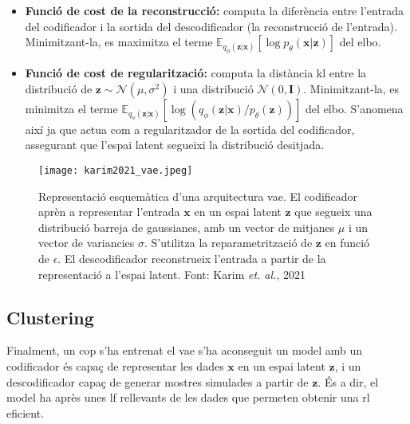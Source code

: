 \documentclass[CAT,BIB]{TFUOC}%
\begin{document}
        \begin{itemize}
            \item \textbf{Funció de cost de la reconstrucció:}
            computa la diferència entre l'entrada del codificador
            i la sortida del descodificador
            (la reconstrucció de l'entrada).
            Minimitzant-la, es maximitza el terme
            $\mathbb{E}_{q_\phi(\mathbf{z|x})} [ \log p_\theta(\mathbf{x|z}) ]$
            del \gls{elbo}.

            \item \textbf{Funció de cost de regularització:}
            computa la distància \gls{kl}
            entre la distribució de $\mathbf{z} \sim \mathcal{N}(\mu, \sigma^2)$
            i una distribució $\mathcal{N}(0, \mathbf{I})$.
            Minimitzant-la, es minimitza el terme
            $\mathbb{E}_{q_\phi(\mathbf{z|x})} [ \log ( q_\phi(\mathbf{z|x}) / p_\theta(\mathbf{z}) ) ]$
            del \gls{elbo}.
            S'anomena així ja que actua com a regularitzador
            de la sortida del codificador,
            assegurant que l'espai latent segueixi la distribució desitjada.
        \end{itemize}

        \begin{figure}
            \centering
            \texttt{[image: karim2021\_vae.jpeg]}
            \caption{
                Representació esquemàtica d'una arquitectura \gls{vae}.
                El codificador aprèn a representar l'entrada $\mathbf{x}$
                en un espai latent $\mathbf{z}$
                que segueix una distribució barreja de gaussianes,
                amb un vector de mitjanes $\mu$ i un vector de variancies $\sigma$.
                S'utilitza la reparametrització de $\mathbf{z}$ en funció de $\epsilon$.
                El descodificador reconstrueix l'entrada
                a partir de la representació a l'espai latent.
                Font: Karim \textit{et. al.}, 2021 \citep{Karim2021}
            }
            \label{fig:vae_min}
        \end{figure}



    \subsection{Clustering}
    \label{s:clustering}

        Finalment, un cop s'ha entrenat el \gls{vae}
        s'ha aconseguit un model amb un codificador
        és capaç de representar les dades $\mathbf{x}$ en un espai latent $\mathbf{z}$,
        i un descodificador capaç de generar mostres simulades
        a partir de $\mathbf{z}$.
        És a dir, el model ha après unes \gls{lf} rellevants de les dades
        que permeten obtenir una \gls{rl} eficient.
\end{document}

